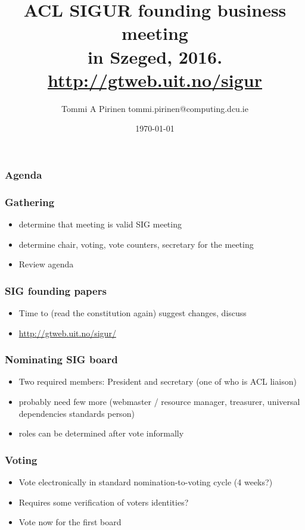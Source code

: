 \documentclass{beamer}
\title{ACL SIGUR founding business meeting\\
\scriptsize{in Szeged, 2016.\\
\url{http://gtweb.uit.no/sigur}}}
\author{Tommi A Pirinen \scriptsize \guilsinglleft tommi.pirinen@computing.dcu.ie \guilsinglright }
\institute{DCU, CNGL}
\date{\today}
\makeatletter
\newcommand\listofframes{\@starttoc{lbf}}
\makeatother
\begin{document}

\maketitle

\begin{frame}
    \frametitle{Agenda}
    \listofframes
\end{frame}

\begin{frame}
    \frametitle{Gathering}
    \begin{itemize}
        \item determine that meeting is valid SIG meeting
        \item determine chair, voting, vote counters, secretary for the meeting
        \item Review agenda
    \end{itemize}
\end{frame}

\begin{frame}
    \frametitle{SIG founding papers}
    \begin{itemize}
        \item Time to (read the constitution again) suggest changes, discuss
        \item \url{http://gtweb.uit.no/sigur/}
    \end{itemize}
\end{frame}

\begin{frame}
    \frametitle{Nominating SIG board}
    \begin{itemize}
        \item Two required members:
            President and secretary (one of who is ACL liaison)
        \item probably need few more (webmaster / resource manager, 
            treasurer, universal dependencies standards person)
        \item roles can be determined after vote informally
    \end{itemize}
\end{frame}

\begin{frame}
\frametitle{Voting}

\begin{itemize}
    \item Vote electronically in standard nomination-to-voting cycle (4 weeks?)
    \item Requires some verification of voters identities?
    \item Vote now for the first board
\end{itemize}
\end{frame}
\end{document}
